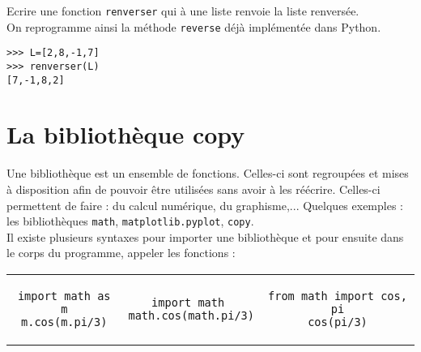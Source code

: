 \begin{exercice}
Ecrire une fonction \verb?renverser? qui \` a une liste renvoie la liste renversée.\\
On reprogramme ainsi la méthode \verb?reverse? déj\` a implémentée dans Python.
\begin{verbatim}
>>> L=[2,8,-1,7]
>>> renverser(L)
[7,-1,8,2]
\end{verbatim}
\end{exercice}


\section{La bibliothèque copy}

\begin{defn}
Une bibliothèque est un ensemble de fonctions. Celles-ci sont regroupées et mises à disposition afin de pouvoir être utilisées sans avoir à les réécrire. Celles-ci permettent de faire : du calcul numérique, du graphisme,... Quelques exemples : les bibliothèques \verb?math?, \verb?matplotlib.pyplot?, \verb?copy?. \\
Il existe plusieurs syntaxes pour importer une bibliothèque et pour ensuite dans le corps du programme, appeler les fonctions :

\begin{center}
\begin{tabular}{c|c|c}
\begin{minipage}{4cm}
\begin{verbatim}
import math as m
m.cos(m.pi/3)
\end{verbatim} 
\end{minipage} &
\begin{minipage}{4cm}
\begin{verbatim}
import math 
math.cos(math.pi/3)
\end{verbatim}        
\end{minipage}&
\begin{minipage}{4cm}
\begin{verbatim}
from math import cos, pi
cos(pi/3)
\end{verbatim} 
\end{minipage} 
\end{tabular}
\end{center}

\end{defn}

